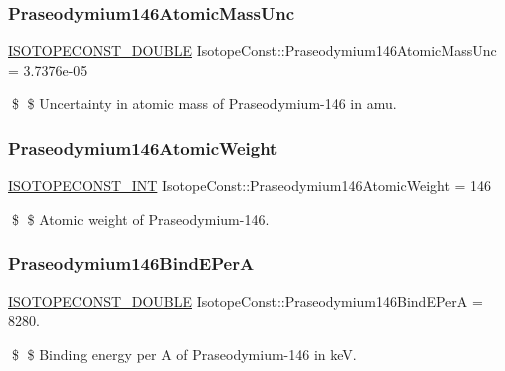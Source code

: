 \subsubsection{\texorpdfstring{Praseodymium146\+Atomic\+Mass\+Unc}{Praseodymium146AtomicMassUnc}}
{\footnotesize\ttfamily \mbox{\hyperlink{group___isotope_const-_macros_ga8f45a7272ce02c0b4c65c44636ed719a}{I\+S\+O\+T\+O\+P\+E\+C\+O\+N\+S\+T\+\_\+\+D\+O\+U\+B\+LE}} Isotope\+Const\+::\+Praseodymium146\+Atomic\+Mass\+Unc = 3.\+7376e-\/05}

\$ \$ Uncertainty in atomic mass of Praseodymium-\/146 in amu. \mbox{\label{group___isotope_const-_praseodymium-_pr146_ga3a15cb6e745b3a61b421c6f4e1c25cd5}} 
\subsubsection{\texorpdfstring{Praseodymium146\+Atomic\+Weight}{Praseodymium146AtomicWeight}}
{\footnotesize\ttfamily \mbox{\hyperlink{group___isotope_const-_macros_ga5f18360b3e99483a35c32d789e62621c}{I\+S\+O\+T\+O\+P\+E\+C\+O\+N\+S\+T\+\_\+\+I\+NT}} Isotope\+Const\+::\+Praseodymium146\+Atomic\+Weight = 146}

\$ \$ Atomic weight of Praseodymium-\/146. \mbox{\label{group___isotope_const-_praseodymium-_pr146_gaf4ea0c95fd40b931aed66a24974fb37c}} 
\subsubsection{\texorpdfstring{Praseodymium146\+Bind\+E\+PerA}{Praseodymium146BindEPerA}}
{\footnotesize\ttfamily \mbox{\hyperlink{group___isotope_const-_macros_ga8f45a7272ce02c0b4c65c44636ed719a}{I\+S\+O\+T\+O\+P\+E\+C\+O\+N\+S\+T\+\_\+\+D\+O\+U\+B\+LE}} Isotope\+Const\+::\+Praseodymium146\+Bind\+E\+PerA = 8280.}

\$ \$ Binding energy per A of Praseodymium-\/146 in keV. \mbox{\label{group___isotope_const-_praseodymium-_pr146_ga0e9c690a571daed0586dbdc6fd8bae20}} 
